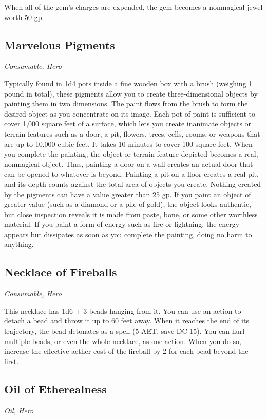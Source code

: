 When all of the gem's charges are expended, the gem becomes a nonmagical jewel worth 50 gp.

\subsection{Marvelous Pigments}
\textit{Consumable, Hero} 

Typically found in 1d4 pots inside a fine wooden box with a brush (weighing 1 pound in total), these pigments allow you to create three-dimensional objects by painting them in two dimensions. The paint flows from the brush to form the desired object as you concentrate on its image. Each pot of paint is sufficient to cover 1,000 square feet of a surface, which lets you create inanimate objects or terrain features-such as a door, a pit, flowers, trees, cells, rooms, or weapons-that are up to 10,000 cubic feet. It takes 10 minutes to cover 100 square feet.  When you complete the painting, the object or terrain feature depicted becomes a real, nonmagical object. Thus, painting a door on a wall creates an actual door that can be opened to whatever is beyond. Painting a pit on a floor creates a real pit, and its depth counts against the total area of objects you create.  Nothing created by the pigments can have a value greater than 25 gp. If you paint an object of greater value (such as a diamond or a pile of gold), the object looks authentic, but close inspection reveals it is made from paste, bone, or some other worthless material.  If you paint a form of energy such as fire or lightning, the energy appears but dissipates as soon as you complete the painting, doing no harm to anything.

\subsection{Necklace of Fireballs}
\textit{Consumable, Hero}

This necklace has 1d6 + 3 beads hanging from it. You can use an action to detach a bead and throw it up to 60 feet away. When it reaches the end of its trajectory, the bead detonates as a  spell (5 AET, save DC 15). You can hurl multiple beads, or even the whole necklace, as one action. When you do so, increase the effective aether cost of the fireball by 2 for each bead beyond the first.

\subsection{Oil of Etherealness}
\textit{Oil, Hero}

